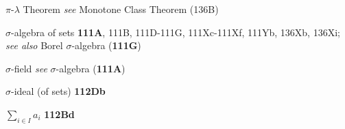 $\pi$-$\lambda$ Theorem {\it see} Monotone Class Theorem (136B)

\indexmedskip





\indexmedskip
\indexheader{$\scriptstyle\pmb{\sigma}$}







$\sigma$-algebra of sets {\bf 111A}, 111B,
111D-111G, 
111Xc-111Xf, 
111Yb, 136Xb, 136Xi; 
  {\it see also}
Borel $\sigma$-algebra ({\bf 111G})
















$\sigma$-field {\it see} $\sigma$-algebra ({\bf 111A})















{$\sigma$-ideal }
(of sets) {\bf 112Db}

























\indexmedskip
\indexheader{$\scriptstyle\pmb{\Sigma}$}







$\sum_{i\in I}a_i$ {\bf 112Bd}





































